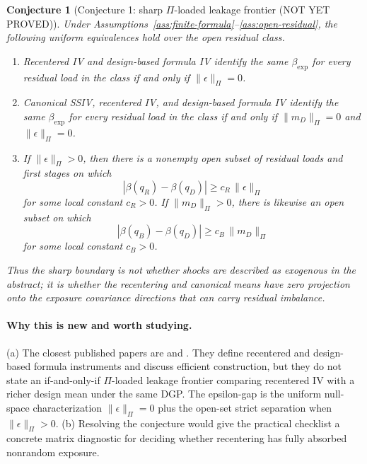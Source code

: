 \documentclass[11pt]{article}
\theoremstyle{definition}
\theoremstyle{plain}
\newtheorem{conjecture}{Conjecture}
\theoremstyle{remark}
\begin{document}
\begin{conjecture}[Conjecture 1: sharp \(\Pi\)-loaded leakage frontier (NOT YET PROVED)]\label{conj:uniform-frontier}
Under Assumptions~\ref{ass:finite-formula}--\ref{ass:open-residual}, the following uniform equivalences hold over the open residual class.
\begin{enumerate}[label=(\roman*),leftmargin=*]
\item Recentered IV and design-based formula IV identify the same \(\beta_{\exp}\) for every residual load in the class if and only if \(\|\epsilon\|_\Pi=0\).
\item Canonical SSIV, recentered IV, and design-based formula IV identify the same \(\beta_{\exp}\) for every residual load in the class if and only if \(\|m_D\|_\Pi=0\) and \(\|\epsilon\|_\Pi=0\).
\item If \(\|\epsilon\|_\Pi>0\), then there is a nonempty open subset of residual loads and first stages on which
\[
  |\beta(q_R)-\beta(q_D)|
  \ge
  c_R\,\|\epsilon\|_\Pi
\]
for some local constant \(c_R>0\).  If \(\|m_D\|_\Pi>0\), there is likewise an open subset on which
\[
  |\beta(q_B)-\beta(q_D)|
  \ge
  c_B\,\|m_D\|_\Pi
\]
for some local constant \(c_B>0\).
\end{enumerate}
Thus the sharp boundary is not whether shocks are described as exogenous in the abstract; it is whether the recentering and canonical means have zero projection onto the exposure covariance directions that can carry residual imbalance.
\end{conjecture}
\paragraph{Why this is new and worth studying.}
(a) The closest published papers are \citet{BorusyakHull2023Econometrica} and \citet{BorusyakHullJaravel2025ECTJ}.  They define recentered and design-based formula instruments and discuss efficient construction, but they do not state an if-and-only-if \(\Pi\)-loaded leakage frontier comparing recentered IV with a richer design mean under the same DGP.  The epsilon-gap is the uniform null-space characterization \(\|\epsilon\|_\Pi=0\) plus the open-set strict separation when \(\|\epsilon\|_\Pi>0\).  (b) Resolving the conjecture would give the \citet{BorusyakHullJaravel2025JEP} practical checklist a concrete matrix diagnostic for deciding whether recentering has fully absorbed nonrandom exposure.
\end{document}
